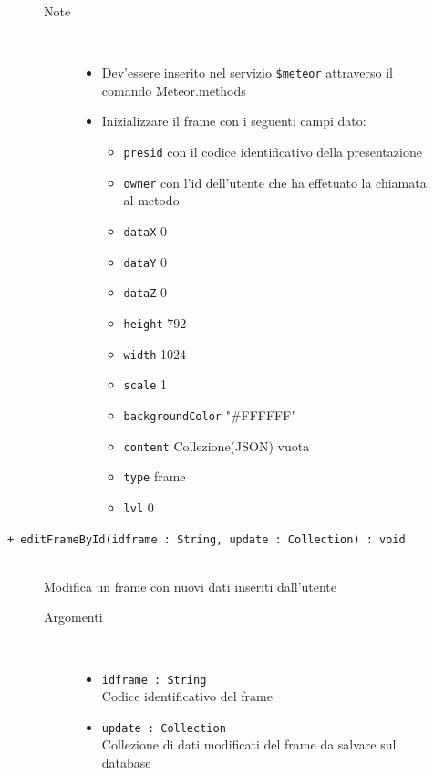 \begin{description}
\begin{description}
\begin{description}
\begin{itemize}
				\end{itemize}
			\item[Note] \hfill \\
			\begin{itemize}
					\item Dev'essere inserito nel servizio \texttt{\$meteor} attraverso il comando Meteor.methods
					\item Inizializzare il frame con i seguenti campi dato:
					\begin{itemize}
					\item \texttt{presid} con il codice identificativo della presentazione
					\item \texttt{owner} con l'id dell'utente che ha effetuato la chiamata al metodo
					\item \texttt{dataX} 0
					\item \texttt{dataY} 0
					\item \texttt{dataZ} 0
					\item \texttt{height} 792
					\item \texttt{width} 1024
					\item \texttt{scale} 1
					\item \texttt{backgroundColor} "#FFFFFF"
					\item \texttt{content} Collezione(JSON) vuota
					\item \texttt{type} frame
					\item \texttt{lvl} 0
					\end{itemize}
				\end{itemize}
		\end{description}
	\end{description}
	
	\begin{description}
		\item[\texttt{+ editFrameById(idframe : String, update : Collection) : void			}] \hfill \\
			Modifica un frame con nuovi dati inseriti dall'utente
			
		\begin{description}
			\item[Argomenti] \hfill \\
				\begin{itemize}
				
					\item \texttt{idframe : String			} \hfill \\
					Codice identificativo del frame
					\item \texttt{update : Collection		} \hfill \\
					Collezione di dati modificati del frame da salvare sul database
					

\end{itemize}
\end{description}
\end{description}
\end{description}
